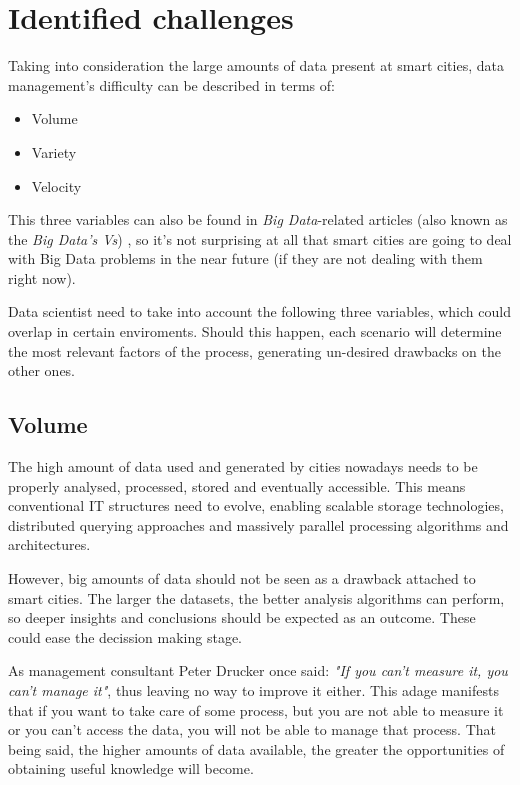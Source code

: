\section{Identified challenges}

Taking into consideration the large amounts of data present at smart cities, data management's difficulty can be described in terms of:
\begin{itemize}
	\item Volume
	\item Variety
	\item Velocity
\end{itemize}

This three variables can also be found in \textit{Big Data}-related articles (also known as the \textit{Big Data's Vs}) \cite{zikopoulos2011understanding} \cite{russom2011big}, so it's not surprising at all that smart cities are going to deal with Big Data problems in the near future (if they are not dealing with them right now).

Data scientist need to take into account the following three variables, which could overlap in certain enviroments. Should this happen, each scenario will determine the most relevant factors of the process, generating un-desired drawbacks on the other ones.

\subsection{Volume}

The high amount of data used and generated by cities nowadays needs to be properly analysed, processed, stored and eventually accessible. This means conventional IT structures need to evolve, enabling scalable storage technologies, distributed querying approaches and massively parallel processing algorithms and architectures.


However, big amounts of data should not be seen as a drawback attached to smart cities. The larger the datasets, the better analysis algorithms can perform, so deeper insights and conclusions should be expected as an outcome. These could ease the decission making stage.

As management consultant Peter Drucker once said: \textit{"If you can't measure it, you can't manage it"}, thus leaving no way to improve it either. This adage manifests that if you want to take care of some process, but you are not able to measure it or you can't access the data, you will not be able to manage that process. That being said, the higher amounts of data available, the greater the opportunities of obtaining useful knowledge will become.

